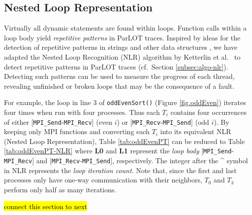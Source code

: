 \subsection{Nested Loop Representation}



Virtually all dynamic statements are found within loops.
%
Function calls within a loop body yield \textit{repetitive patterns}
in ParLOT traces.
%
Inspired by ideas for the detection of repetitive patterns in strings \cite{nakamura_fast_2013}
and other data structures \cite{kmr},
we have adapted the Nested Loop Recognition (NLR) algorithm by Ketterlin et al.~\cite{Ketterlin-nlr}
to detect repetitive patterns in ParLOT traces (cf.~Section \ref{subsec:algo-nlr}).
Detecting such patterns can be used to measure the progress of each thread,
revealing unfinished or broken loops that may be the consequence of a fault.

For example, the loop in line 3 of \texttt{oddEvenSort()} (Figure \ref{fig.oddEven}) iterates
four times when run with four processes.
Thus each $T_i$ contains four occurrences of either [\texttt{MPI\_Send}-\texttt{MPI\_Recv}] (even $i$)
or [\texttt{MPI\_Recv}-\texttt{MPI\_Send}] (odd $i$).
By keeping only MPI functions and converting each $T_i$ into its equivalent NLR (Nested Loop Representation),
Table \ref{tab:oddEvenPT} can be reduced to Table \ref{tab:oddEvenPT-NLR} where \textbf{L0} and \textbf{L1}
represent the \textit{loop body} [\texttt{MPI\_Send}-\texttt{MPI\_Recv}] and
[\texttt{MPI\_Recv}-\texttt{MPI\_Send}], respectively.
The integer after the \^{} symbol in NLR represents the \textit{loop iteration count}.
Note that, since the first and last processes only have one-way communication with their neighbors,
$T_0$ and $T_3$ perform only half as many iterations.

\hl{connect this section to next}

